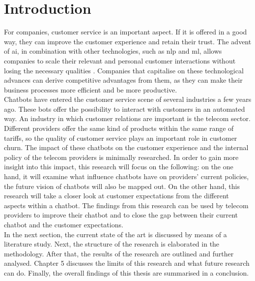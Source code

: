 \mainmatter
\pagestyle{headings}

\chapter{Introduction}
\label{ch:introduction}
For companies, customer service is an important aspect. If it is offered in a good way, they can improve the customer experience and retain their trust.
The advent of \acrshort{ai}, in combination with other technologies, such as \acrshort{nlp} and \acrshort{ml}, allows companies to scale their relevant and personal customer interactions without losing the necessary qualities \citep*{Quintino2019, Wilson2017}. Companies that capitalise on these technological advances can derive competitive advantages from them, as they can make their business processes more efficient and be more productive.\\
\break
Chatbots have entered the customer service scene of several industries a few years ago. These bots offer the possibility to interact with customers in an automated way. An industry in which customer relations are important is the telecom sector. Different providers offer the same kind of products within the same range of tariffs, so the quality of customer service plays an important role in customer churn. The impact of these chatbots on the customer experience and the internal policy of the telecom providers is minimally researched. In order to gain more insight into this impact, this research will focus on the following: on the one hand, it will examine what influence chatbots have on providers' current policies, the future vision of chatbots will also be mapped out. On the other hand, this research will take a closer look at customer expectations from the different aspects within a chatbot. The findings from this research can be used by telecom providers to improve their chatbot and to close the gap between their current chatbot and the customer expectations.\\
\break
In the next section, the current state of the art is discussed by means of a literature study. Next, the structure of the research is elaborated in the methodology. After that, the results of the research are outlined and further analysed. Chapter 5 discusses the limits of this research and what future research can do. Finally, the overall findings of this thesis are summarised in a conclusion.